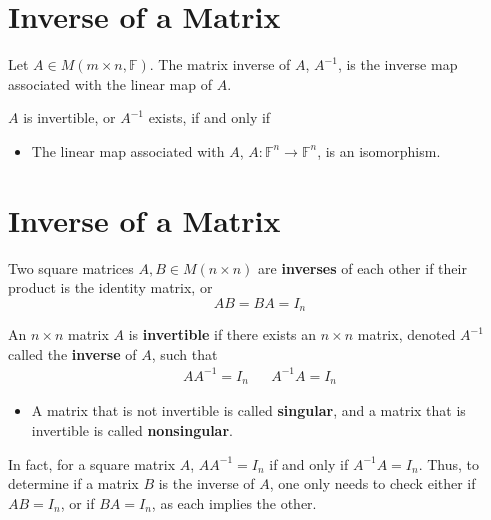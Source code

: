 \documentclass[letterpaper,12pt]{article}
\begin{document}
\section*{Inverse of a Matrix}
\begin{definition}
Let $A \in M(m \times n, \mathbb{F})$. The matrix inverse of $A$, $A^{-1}$, is the inverse map associated with the linear map of $A$.

$A$ is invertible, or $A^{-1}$ exists, if and only if
\begin{itemize}
    \item The linear map associated with $A$, $A: \mathbb{F}^n \rightarrow \mathbb{F}^n$, is an isomorphism.
\end{itemize}
\end{definition}

\section*{Inverse of a Matrix}
\begin{definition}
Two square matrices $A, B \in M(n \times n)$ are \textbf{inverses} of each other if their product is the identity matrix, or
\begin{equation*}
    AB = BA = I_n
\end{equation*}
\end{definition}

\begin{definition}
An $n \times n$ matrix $A$ is \textbf{invertible} if there exists an $n \times n$ matrix, denoted $A^{-1}$ called the \textbf{inverse} of $A$, such that
\begin{align*}
    AA^{-1} = I_n && A^{-1}A = I_n
\end{align*}
\begin{itemize}
    \item A matrix that is not invertible is called \textbf{singular}, and a matrix that is invertible is called \textbf{nonsingular}.
\end{itemize}
\end{definition}
In fact, for a square matrix $A$, $AA^{-1} = I_n$ if and only if $A^{-1}A = I_n$. Thus, to determine if a matrix $B$ is the inverse of $A$, one only needs to check either if $AB = I_n$, or if $BA = I_n$, as each implies the other.
\end{document}
